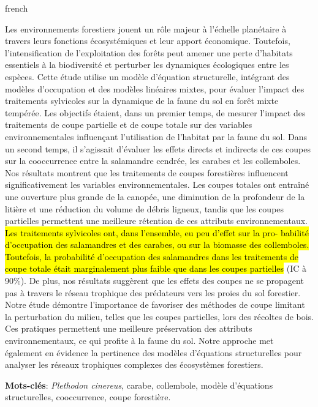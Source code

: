 \begin{otherlanguage*}{french}

Les environnements forestiers jouent un rôle majeur à l’échelle planétaire à travers leurs fonctions écosystémiques et leur apport économique. 
Toutefois, l'intensification de l'exploitation des forêts peut amener une perte d'habitats essentiels à la biodiversité et perturber les dynamiques écologiques entre les espèces. 
Cette étude utilise un modèle d'équation structurelle, intégrant des modèles d’occupation et des modèles linéaires mixtes, pour évaluer l’impact des traitements sylvicoles sur la dynamique de la faune du sol en forêt mixte tempérée. 
Les objectifs étaient, dans un premier temps, de mesurer l’impact des traitements de coupe partielle et de coupe totale sur des variables environnementales influençant l’utilisation de l’habitat par la faune du sol. 
Dans un second temps, il s'agissait d’évaluer les effets directs et indirects de ces coupes sur la cooccurrence entre la salamandre cendrée, les carabes et les collemboles. 
Nos résultats montrent que les traitements de coupes forestières influencent significativement les variables environnementales. 
Les coupes totales ont entraîné une ouverture plus grande de la canopée, une diminution de la profondeur de la litière et une réduction du volume de débris ligneux, 
tandis que les coupes partielles permettent une meilleure rétention de ces attributs environnementaux. 
\hl{Les traitements sylvicoles ont, dans l’ensemble, eu peu d’effet sur la pro- babilité d’occupation des salamandres et des carabes, ou sur la biomasse des collemboles. 
Toutefois, la probabilité d’occupation des salamandres dans les traitements de coupe totale était marginalement plus faible que dans les coupes partielles} (IC à 90\%). 
De plus, nos résultats suggèrent que les effets des coupes ne se propagent pas à travers le réseau trophique des prédateurs vers les proies du sol forestier. 
Notre étude démontre l'importance de favoriser des méthodes de coupe limitant la perturbation du milieu, telles que les coupes partielles, lors des récoltes de bois. 
Ces pratiques permettent une meilleure préservation des attributs environnementaux, ce qui profite à la faune du sol. 
Notre approche met également en évidence la pertinence des modèles d’équations structurelles pour analyser les réseaux trophiques complexes des écosystèmes forestiers. 

\textbf{Mots-clés}: \textit{Plethodon cinereus}, carabe, collembole, modèle d'équations structurelles, cooccurrence, coupe forestière.
\end{otherlanguage*}


